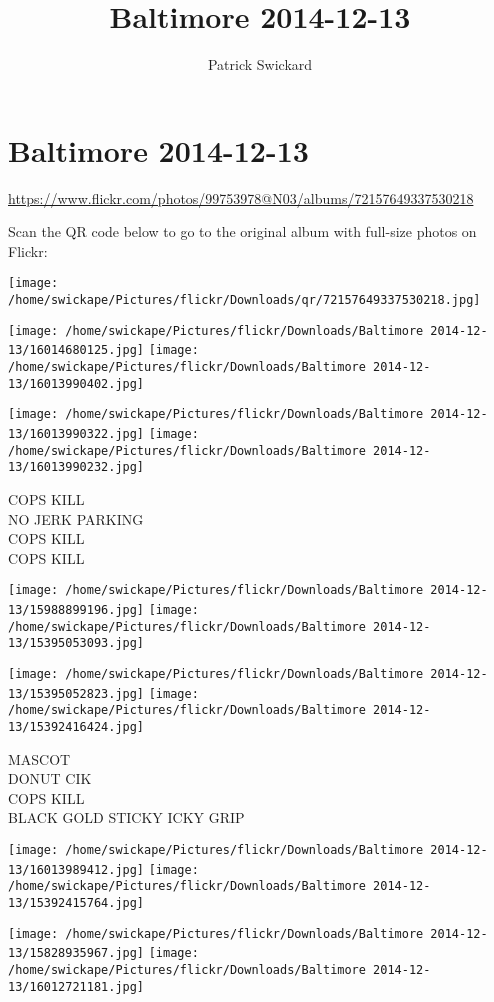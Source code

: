\documentclass[10pt,letterpaper]{article}
\title{Baltimore 2014-12-13}
\author{Patrick Swickard}
\date{}
\begin{document}
\section*{Baltimore 2014-12-13}

\url{https://www.flickr.com/photos/99753978@N03/albums/72157649337530218}

Scan the QR code below to go to the original album with full-size photos on Flickr:

\texttt{[image: /home/swickape/Pictures/flickr/Downloads/qr/72157649337530218.jpg]}
\pagebreak

\texttt{[image: /home/swickape/Pictures/flickr/Downloads/Baltimore 2014-12-13/16014680125.jpg]}
\texttt{[image: /home/swickape/Pictures/flickr/Downloads/Baltimore 2014-12-13/16013990402.jpg]}

\texttt{[image: /home/swickape/Pictures/flickr/Downloads/Baltimore 2014-12-13/16013990322.jpg]}
\texttt{[image: /home/swickape/Pictures/flickr/Downloads/Baltimore 2014-12-13/16013990232.jpg]}

COPS KILL\\
NO JERK PARKING\\
COPS KILL\\
COPS KILL
\pagebreak

\texttt{[image: /home/swickape/Pictures/flickr/Downloads/Baltimore 2014-12-13/15988899196.jpg]}
\texttt{[image: /home/swickape/Pictures/flickr/Downloads/Baltimore 2014-12-13/15395053093.jpg]}

\texttt{[image: /home/swickape/Pictures/flickr/Downloads/Baltimore 2014-12-13/15395052823.jpg]}
\texttt{[image: /home/swickape/Pictures/flickr/Downloads/Baltimore 2014-12-13/15392416424.jpg]}

MASCOT\\
DONUT CIK\\
COPS KILL\\
BLACK GOLD STICKY ICKY GRIP
\pagebreak

\texttt{[image: /home/swickape/Pictures/flickr/Downloads/Baltimore 2014-12-13/16013989412.jpg]}
\texttt{[image: /home/swickape/Pictures/flickr/Downloads/Baltimore 2014-12-13/15392415764.jpg]}

\texttt{[image: /home/swickape/Pictures/flickr/Downloads/Baltimore 2014-12-13/15828935967.jpg]}
\texttt{[image: /home/swickape/Pictures/flickr/Downloads/Baltimore 2014-12-13/16012721181.jpg]}
\end{document}
